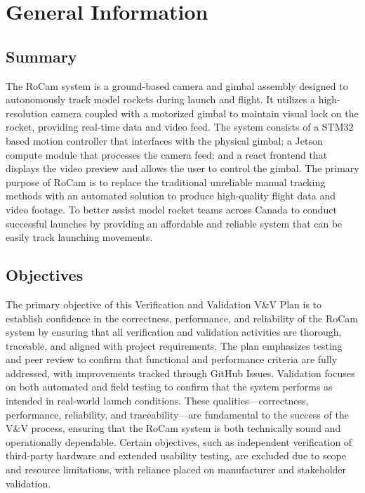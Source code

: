 \documentclass[12pt, titlepage]{article}
\begin{document}

\section{General Information}

\subsection{Summary}

The RoCam system is a ground-based camera and gimbal assembly designed to
autonomously track model rockets during launch and flight. It utilizes a
high-resolution camera coupled with a motorized gimbal to maintain visual lock
on the rocket, providing real-time data and video feed. The system consists of
a STM32 based motion controller that interfaces with the physical gimbal; a
Jetson compute module that processes the camera feed; and a react frontend that
displays the video preview and allows the user to control the gimbal. The
primary purpose of RoCam is to replace the traditional unreliable manual
tracking methods with an automated solution to produce high-quality flight data
and video footage. To better assist model rocket teams across Canada to conduct
successful launches by providing an affordable and reliable system that can be
easily track launching movements.


\subsection{Objectives}
The primary objective of this Verification and Validation V\&V Plan is to
establish confidence in the correctness, performance, and reliability of the
RoCam system by ensuring that all verification and validation activities are
thorough, traceable, and aligned with project requirements. The plan emphasizes
testing and peer review to confirm that functional and performance criteria are
fully addressed, with improvements tracked through GitHub Issues. Validation
focuses on both automated and field testing to confirm that the system performs
as intended in real-world launch conditions. These qualities—correctness,
performance, reliability, and traceability—are fundamental to the success of
the V\&V process, ensuring that the RoCam system is both technically sound and
operationally dependable. Certain objectives, such as independent verification
of third-party hardware and extended usability testing, are excluded due to
scope and resource limitations, with reliance placed on manufacturer and
stakeholder validation.
\end{document}
